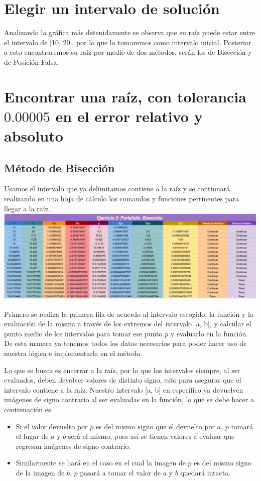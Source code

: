 \documentclass{article}
\begin{document}
\section{Elegir un intervalo de solución}
Analizando la gráfica más detenidamente se observa que su raíz puede estar entre el intervalo de [10, 20], por lo que lo tomaremos como intervalo inicial. Posterior a esto encontraremos su raíz por medio de dos métodos, serán los de Bisección y de Posición Falsa.

\section{Encontrar una raíz, con tolerancia \(0.00005\) en el error relativo y absoluto}
\newpage
\subsection{Método de Bisección}
Usamos el intervalo que ya delimitamos contiene a la raíz y se continuará realizando en una hoja de cálculo los comandos y funciones pertinentes para llegar a la raíz.
\\
\includegraphics[scale=0.3]{Biseccion.png}

Primero se realiza la primera fila de acuerdo al intervalo escogido, la función y la evaluación de la misma a través de los extremos del intervalo [a, b], y calcular el punto medio de los intervalos para tomar ese punto \(p\) y evaluarlo en la función. De esta manera ya tenemos todos los datos necesarios para poder hacer uso de nuestra lógica e implementarla en el método.

Lo que se busca es encerrar a la raíz, por lo que los intervalos siempre, al ser evaluados, deben devolver valores de distinto signo, esto para asegurar que el intervalo contiene a la raíz. Nuestro intervalo [a, b] en específico ya devuelven imágenes de signo contrario al ser evaluadas en la función, lo que se debe hacer a continuación es:

\begin{itemize}
    \item Si el valor devuelto por \(p\) es del mismo signo que el devuelto por \(a\), \(p\) tomará el lugar de \(a\) y \(b\) será el mismo, pues así se tienen valores a evaluar que regresan imágenes de signo contrario.
    \item Similarmente se hará en el caso en el cual la imagen de \(p\) es del mismo signo de la imagen de \(b\), \(p\) pasará a tomar el valor de \(a\) y \(b\) quedará intacta.
\end{itemize}
\end{document}
